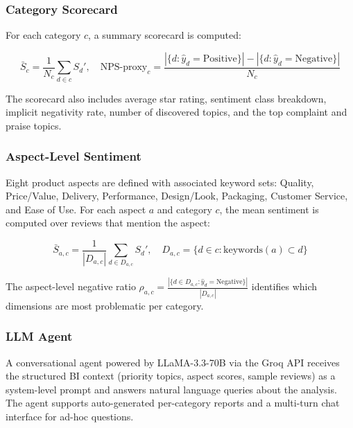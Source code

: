 \subsubsection{Category Scorecard}
\begin{justify}
For each category $c$, a summary scorecard is computed:

\begin{equation}
    \bar{S}_c = \frac{1}{N_c} \sum_{d \in c} S_d', \quad \text{NPS-proxy}_c = \frac{|\{d : \hat{y}_d = \text{Positive}\}| - |\{d : \hat{y}_d = \text{Negative}\}|}{N_c}
\end{equation}

The scorecard also includes average star rating, sentiment class breakdown, implicit negativity rate, number of discovered topics, and the top complaint and praise topics.
\end{justify}

\subsubsection{Aspect-Level Sentiment}
\begin{justify}
Eight product aspects are defined with associated keyword sets: Quality, Price/Value, Delivery, Performance, Design/Look, Packaging, Customer Service, and Ease of Use. For each aspect $a$ and category $c$, the mean sentiment is computed over reviews that mention the aspect:

\begin{equation}
    \bar{S}_{a,c} = \frac{1}{|D_{a,c}|} \sum_{d \in D_{a,c}} S_d', \quad D_{a,c} = \{d \in c : \text{keywords}(a) \subset d\}
\end{equation}

The aspect-level negative ratio $\rho_{a,c} = \frac{|\{d \in D_{a,c} : \hat{y}_d = \text{Negative}\}|}{|D_{a,c}|}$ identifies which dimensions are most problematic per category.
\end{justify}

\subsubsection{LLM Agent}
\begin{justify}
A conversational agent powered by LLaMA-3.3-70B via the Groq API receives the structured BI context (priority topics, aspect scores, sample reviews) as a system-level prompt and answers natural language queries about the analysis. The agent supports auto-generated per-category reports and a multi-turn chat interface for ad-hoc questions.
\end{justify}

